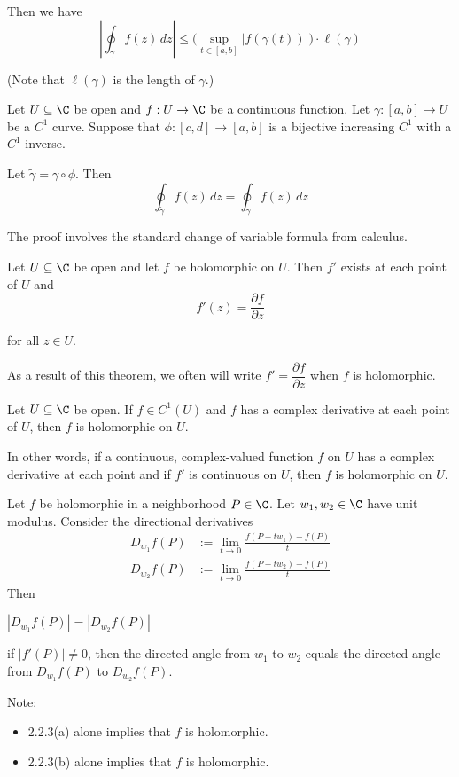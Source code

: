Then we have
$$
	\left|\oint_\gamma f(z)\,dz\right|\leq
	\Big(\sup_{t\in[a,b]}|f(\gamma(t))|\Big)\cdot\ell(\gamma)
$$

(Note that $\ell(\gamma)$ is the length of $\gamma$.)

\label{f74efcb}

Let $U\subseteq\C$ be open and $f:U\to\C$ be a continuous function.
Let $\gamma:[a,b]\to U$ be a $C^1$ curve. Suppose that
$\phi:[c,d]\to[a,b]$ is a bijective increasing $C^1$ with a $C^1$
inverse.


Let $\tilde\gamma=\gamma\circ\phi$. Then
$$\oint_{\tilde\gamma}f(z)\,dz=\oint_\gamma f(z)\,dz$$

The proof involves the standard change of variable formula from
calculus.

\label{f75e43c}

Let $U\subseteq\C$ be open and let $f$ be holomorphic on $U$. Then
$f'$ exists at each point of $U$ and
$$f'(z)=\frac{\partial f}{\partial z}$$

for all $z\in U$.

As a result of this theorem, we often will write $f'=\dfrac{\partial
		f}{\partial z}$ when $f$ is holomorphic.

\label{d037b0f}

Let $U\subseteq\C$ be open. If $f\in C^1(U)$ and $f$ has a complex
derivative at each point of $U$, then $f$ is holomorphic on $U$.

In other words, if a continuous, complex-valued function $f$ on $U$ has
a complex derivative at each point and if $f'$ is continuous on $U$,
then $f$ is holomorphic on $U$.

\label{c41052e}

Let $f$ be holomorphic in a neighborhood $P\in\C$. Let $w_1,w_2\in\C$
have unit modulus. Consider the directional derivatives
\begin{align*}
	D_{w_1}f(P) & :=\lim_{t\to0}\frac{f(P+tw_1)-f(P)}t \\
	D_{w_2}f(P) & :=\lim_{t\to0}\frac{f(P+tw_2)-f(P)}t
\end{align*}
Then
\begin{enumerata}
	\item $|D_{w_1}f(P)|=|D_{w_2}f(P)|$
	\item if $|f'(P)|\neq0$, then the directed angle from $w_1$ to
	$w_2$ equals the directed angle from $D_{w_1}f(P)$ to $D_{w_2}f(P)$.
\end{enumerata}
Note:
\begin{itemize}
	\item 2.2.3(a) alone implies that $f$ is holomorphic.
	\item 2.2.3(b) alone implies that $f$ is holomorphic.
\end{itemize}

